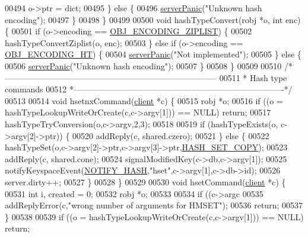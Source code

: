 \begin{DoxyCode}
00494         o->ptr = dict;
00495     \} \textcolor{keywordflow}{else} \{
00496         \hyperlink{server_8h_a11cc378e7778a830b41240578de3b204}{serverPanic}(\textcolor{stringliteral}{"Unknown hash encoding"});
00497     \}
00498 \}
00499 
00500 \textcolor{keywordtype}{void} hashTypeConvert(robj *o, \textcolor{keywordtype}{int} enc) \{
00501     \textcolor{keywordflow}{if} (o->encoding == \hyperlink{server_8h_aabf064ede983103f1fd0df2086e84eee}{OBJ\_ENCODING\_ZIPLIST}) \{
00502         hashTypeConvertZiplist(o, enc);
00503     \} \textcolor{keywordflow}{else} \textcolor{keywordflow}{if} (o->encoding == \hyperlink{server_8h_a9c10219f68afc557d510d108257d238b}{OBJ\_ENCODING\_HT}) \{
00504         \hyperlink{server_8h_a11cc378e7778a830b41240578de3b204}{serverPanic}(\textcolor{stringliteral}{"Not implemented"});
00505     \} \textcolor{keywordflow}{else} \{
00506         \hyperlink{server_8h_a11cc378e7778a830b41240578de3b204}{serverPanic}(\textcolor{stringliteral}{"Unknown hash encoding"});
00507     \}
00508 \}
00509 
00510 \textcolor{comment}{/*-----------------------------------------------------------------------------}
00511 \textcolor{comment}{ * Hash type commands}
00512 \textcolor{comment}{ *----------------------------------------------------------------------------*/}
00513 
00514 \textcolor{keywordtype}{void} hsetnxCommand(\hyperlink{structclient}{client} *c) \{
00515     robj *o;
00516     \textcolor{keywordflow}{if} ((o = hashTypeLookupWriteOrCreate(c,c->argv[1])) == NULL) \textcolor{keywordflow}{return};
00517     hashTypeTryConversion(o,c->argv,2,3);
00518 
00519     \textcolor{keywordflow}{if} (hashTypeExists(o, c->argv[2]->ptr)) \{
00520         addReply(c, shared.czero);
00521     \} \textcolor{keywordflow}{else} \{
00522         hashTypeSet(o,c->argv[2]->ptr,c->argv[3]->ptr,\hyperlink{server_8h_ad182dd9d0a3945ad3fb4045e559b612e}{HASH\_SET\_COPY});
00523         addReply(c, shared.cone);
00524         signalModifiedKey(c->db,c->argv[1]);
00525         notifyKeyspaceEvent(\hyperlink{server_8h_afe25ae13417e6fa5011e7efc69a34bc0}{NOTIFY\_HASH},\textcolor{stringliteral}{"hset"},c->argv[1],c->db->id);
00526         server.dirty++;
00527     \}
00528 \}
00529 
00530 \textcolor{keywordtype}{void} hsetCommand(\hyperlink{structclient}{client} *c) \{
00531     \textcolor{keywordtype}{int} i, created = 0;
00532     robj *o;
00533 
00534     \textcolor{keywordflow}{if} ((c->argc %
00535         addReplyError(c,\textcolor{stringliteral}{"wrong number of arguments for HMSET"});
00536         \textcolor{keywordflow}{return};
00537     \}
00538 
00539     \textcolor{keywordflow}{if} ((o = hashTypeLookupWriteOrCreate(c,c->argv[1])) == NULL) \textcolor{keywordflow}{return};

\end{DoxyCode}
